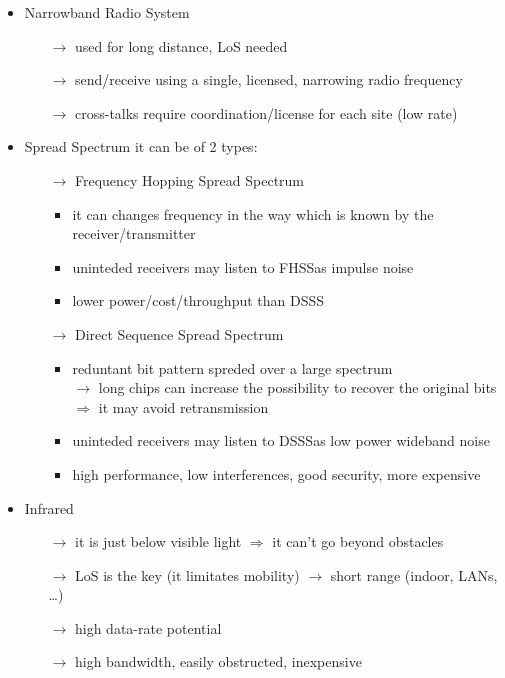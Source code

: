 \begin{itemize}
    \item Narrowband Radio System
    \begin{itemize}
        \item[$\rightarrow$] used for long distance, LoS needed
        \item[$\rightarrow$] send/receive using a single, licensed, narrowing radio frequency
        \item[$\rightarrow$] cross-talks require coordination/license for each site (low rate)
    \end{itemize}
    \item Spread Spectrum
    it can be of 2 types:
    \begin{itemize}
        \item[$\rightarrow$] Frequency Hopping Spread Spectrum
        \begin{itemize}
            \item it can changes frequency in the way which is known by the\\receiver/transmitter
            \item uninteded receivers may listen to FHSS\footFHSS as impulse noise
            \item lower power/cost/throughput than DSSS\footDSSS
        \end{itemize}
        \item[$\rightarrow$] Direct Sequence Spread Spectrum
        \begin{itemize}
            \item reduntant bit pattern spreded over a large spectrum\\
            $\rightarrow$ long chips can increase the possibility to recover the original bits
            $\Rightarrow$ it may avoid retransmission
            \item uninteded receivers may listen to DSSS\footDSSS as low power wideband noise
            \item high performance, low interferences, good security, more expensive
        \end{itemize}
    \end{itemize}
    \item Infrared
    \begin{itemize}
        \item[$\rightarrow$] it is just below visible light $\Rightarrow$ it can't go beyond obstacles
        \item[$\rightarrow$] LoS is the key (it limitates mobility) $\rightarrow$ short range (indoor, LANs, \dots)
        \item[$\rightarrow$] high data-rate potential
        \item[$\rightarrow$] high bandwidth, easily obstructed, inexpensive
    \end{itemize}
\end{itemize}
